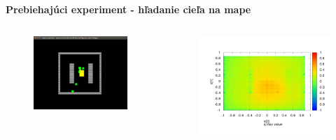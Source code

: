 \documentclass[xcolor=dvipsnames]{beamer}
\begin{document}
\begin{frame}[fragile]{\bf Prebiehajúci experiment - hľadanie cieľa na mape}

    \begin{columns}
    	\begin{column}{0.4\textwidth}

            \begin{figure}[ht]

            \begin{center}
            \includegraphics[width=1.0\textwidth]{images/robots.png}
            \end{center}

            \end{figure}

    	\end{column}
    	\begin{column}{0.8\textwidth}

            \begin{figure}[ht]

            \begin{center}
            \includegraphics[width=1.0\textwidth]{images/q_max_grad.png}
            \end{center}


\end{figure}
\end{column}
\end{columns}
\end{frame}
\end{document}
